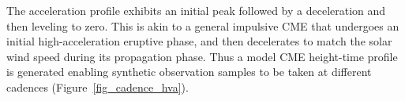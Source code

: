 \documentclass[structabstract]{aa}
\begin{document}
The acceleration profile exhibits an initial peak followed by a deceleration and then leveling to zero. This is akin to a general impulsive CME that undergoes an initial high-acceleration eruptive phase, and then decelerates to match the solar wind speed during its propagation phase. Thus a model CME height-time profile is generated enabling synthetic observation samples to be taken at different cadences (Figure~\ref{fig_cadence_hva}). 

\begin{figure}[t]
\centering
{}

\end{figure}
\end{document}

